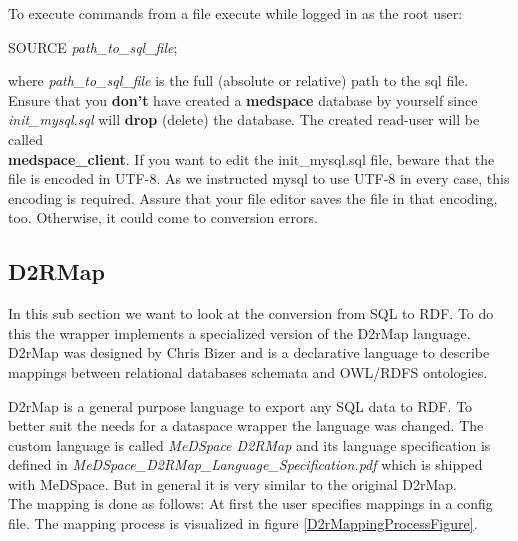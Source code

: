 To execute commands from a file execute while logged in as the root user:

\begin{codebox}
	SOURCE \emph{path\_to\_sql\_file};
\end{codebox}

where \emph{path\_to\_sql\_file} is the full (absolute or relative) path to the sql file.
Ensure that you \textbf{don't} have created a \textbf{medspace} database by yourself since \emph{init\_mysql.sql} will \textbf{drop} (delete) the database. The created read-user will be called\\ 
\textbf{medspace\_client}. If you want to edit the init\_mysql.sql file, beware that the file is encoded in UTF-8. As we instructed mysql to use UTF-8 in every case, this encoding is required. Assure that your file editor saves the file in that encoding, too. Otherwise, it could come to conversion errors.


\subsection{D2RMap}

In this sub section we want to look at the conversion from SQL to RDF. To do this the wrapper implements a specialized version of the D2rMap language. D2rMap was designed by Chris Bizer and is  a declarative language to describe mappings between relational databases schemata and OWL/RDFS ontologies\cite{D2rMap_aDatabaseToRdfMappingLanguage}.

D2rMap is a general purpose language to export any SQL data to RDF. To better suit the needs for a dataspace wrapper the language was changed. The custom language is called \emph{MeDSpace D2RMap} and its language specification is defined in \emph{MeDSpace\_D2RMap\_Language\_Specification.pdf} which is shipped with MeDSpace. But in general it is very similar to the original D2rMap.\\

The mapping is done as follows: At first the user specifies mappings in a config file. 
The mapping process is visualized in figure \ref{D2rMappingProcessFigure}.

